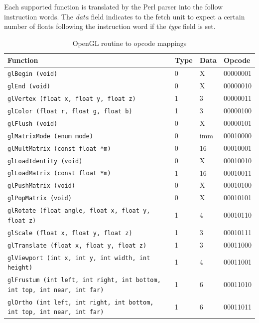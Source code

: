 \documentclass[letterpaper,10pt]{article}
\begin{document}
Each supported function is translated by the Perl parser into the follow instruction words. The \emph{data} field indicates to the fetch unit to expect a certain number of floats following the instruction word if the \emph{type} field is set.

\begin{table}[h!]
\begin{center}
\begin{tabular}{ | l | l | l | l |}
\hline
Function & Type & Data & Opcode \\ \hline
\verb!glBegin (void)! & 0 & X & 00000001 \\ \hline
\verb!glEnd (void)! & 0 & X & 00000010 \\ \hline
\verb!glVertex (float x, float y, float z)! & 1 & 3 & 00000011 \\ \hline
\verb!glColor (float r, float g, float b)! & 1 & 3 & 00000100 \\ \hline
\verb!glFlush (void)! & 0 & X & 00000101 \\ \hline
\verb!glMatrixMode (enum mode)! & 0 & imm & 00010000 \\ \hline
\verb!glMultMatrix (const float *m)! & 0 & 16 & 00010001 \\ \hline
\verb!glLoadIdentity (void)! & 0 & X & 00010010 \\ \hline
\verb!glLoadMatrix (const float *m)! & 1 & 16 & 00010011 \\ \hline
\verb!glPushMatrix (void)! & 0 & X & 00010100 \\ \hline
\verb!glPopMatrix (void)! & 0 & X & 00010101 \\ \hline
\verb!glRotate (float angle, float x, float y, float z)! & 1 & 4 & 00010110 \\ \hline
\verb!glScale (float x, float y, float z)! & 1 & 3 & 00010111 \\ \hline
\verb!glTranslate (float x, float y, float z)! & 1 & 3 & 00011000 \\ \hline
\verb!glViewport (int x, int y, int width, int height)! & 1 & 4 & 00011001 \\ \hline
\verb!glFrustum (int left, int right, int bottom, int top, int near, int far)! & 1 & 6 & 00011010 \\ \hline
\verb!glOrtho (int left, int right, int bottom, int top, int near, int far)! & 1 & 6 & 00011011 \\ \hline
\end{tabular}
\end{center}
\caption{OpenGL routine to opcode mappings}
\end{table}
\end{document}
